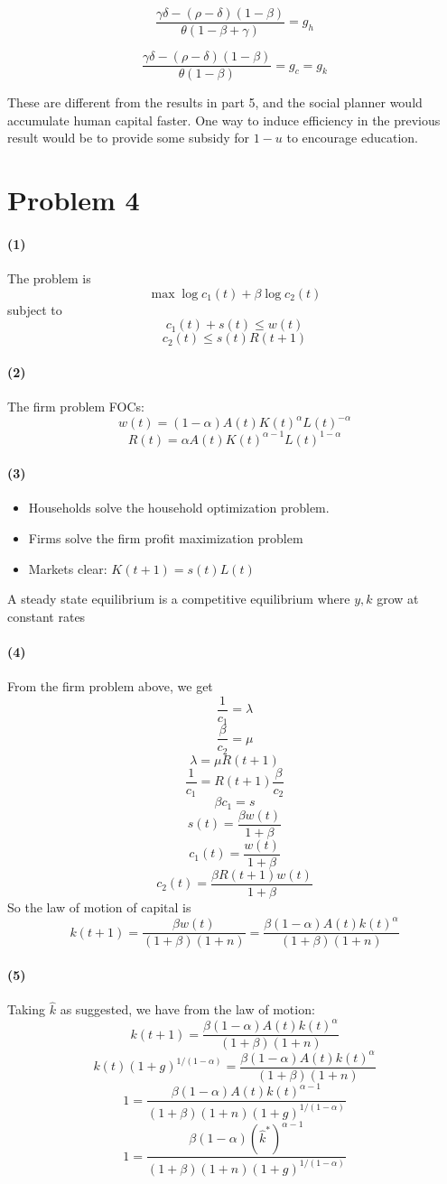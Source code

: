 \documentclass[10pt,letter]{article}
\newcommand{\problem}[1]{\section*{Problem #1}}
\newcommand{\problempart}[1]{\paragraph{#1}}
\begin{document}
\[ \frac{\gamma \delta - (\rho - \delta)(1-\beta)
}{\theta (1-\beta + \gamma)}  =  g_h  \]

\[ \frac{\gamma \delta - (\rho - \delta)(1-\beta)
}{\theta (1-\beta)}  =  g_c = g_k  \]

These are different from the results in part 5, and the social planner would accumulate human capital faster. One way to induce efficiency in the previous result would be to provide some subsidy for $1-u$ to encourage education.
\pagebreak
\problem{4}

\problempart{(1)}
The problem is
\[ \max \log c_1(t) + \beta \log c_2(t) \]
subject to
\[ c_1(t) + s(t) \le w(t) \]
\[ c_2(t) \le s(t)R(t+1) \]
\problempart{(2)}
The firm problem FOCs:
\[ w(t) = (1-\alpha) A(t)K(t)^\alpha L(t)^{-\alpha} \]
\[ R(t) = \alpha A(t)K(t)^{\alpha-1} L(t)^{1-\alpha} \]
\problempart{(3)}
\begin{itemize}
  \item Households solve the household optimization problem.
  \item Firms solve the firm profit maximization problem
  \item Markets clear: $K(t+1) = s(t)L(t)$
\end{itemize}
A steady state equilibrium is a competitive equilibrium where $y, k$
grow at constant rates
\problempart{(4)}
From the firm problem above, we get
\[ \frac{1}{c_1} = \lambda \]
\[ \frac{\beta}{c_2} = \mu \]
\[ \lambda = \mu R(t+1) \]
\[ \frac{1}{c_1} = R(t+1)\frac{\beta}{c_2} \]
\[ \beta  c_1 = s \]
\[ s(t) = \frac{\beta w(t)}{1+\beta} \]
\[ c_1(t) = \frac{w(t)}{1+\beta}  \]
\[ c_2(t) =  \frac{\beta R(t+1)w(t)}{1+\beta} \]
So the law of motion of capital is
\[ k(t+1) = \frac{\beta w(t)}{(1+\beta)(1+n)} = \frac{\beta (1-\alpha) A(t)k(t)^\alpha}{(1+\beta)(1+n)} \]
\problempart{(5)}
Taking $\hat{k}$ as suggested, we have from the law of motion:
\[ k(t+1) = \frac{\beta (1-\alpha) A(t)k(t)^\alpha}{(1+\beta)(1+n)} \]
\[ k(t)(1+g)^{1/(1-\alpha)} = \frac{\beta (1-\alpha) A(t)k(t)^\alpha}{(1+\beta)(1+n)} \]
\[ 1 = \frac{\beta (1-\alpha) A(t)k(t)^{\alpha-1}}{(1+\beta)(1+n)(1+g)^{1/(1-\alpha)}} \]
\[ 1  = \frac{\beta (1-\alpha) (\hat{k}^*)^{\alpha-1}}{(1+\beta)(1+n)(1+g)^{1/(1-\alpha)}} \]
\end{document}
